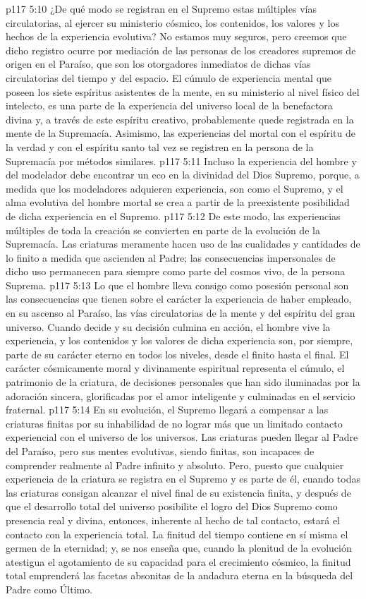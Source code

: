 \vs p117 5:10 ¿De qué modo se registran en el Supremo estas múltiples vías circulatorias, al ejercer su ministerio cósmico, los contenidos, los valores y los hechos de la experiencia evolutiva? No estamos muy seguros, pero creemos que dicho registro ocurre por mediación de las personas de los creadores supremos de origen en el Paraíso, que son los otorgadores inmediatos de dichas vías circulatorias del tiempo y del espacio. El cúmulo de experiencia mental que poseen los siete espíritus asistentes de la mente, en su ministerio al nivel físico del intelecto, es una parte de la experiencia del universo local de la benefactora divina y, a través de este espíritu creativo, probablemente quede registrada en la mente de la Supremacía. Asimismo, las experiencias del mortal con el espíritu de la verdad y con el espíritu santo tal vez se registren en la persona de la Supremacía por métodos similares.
\vs p117 5:11 Incluso la experiencia del hombre y del modelador debe encontrar un eco en la divinidad del Dios Supremo, porque, a medida que los modeladores adquieren experiencia, son como el Supremo, y el alma evolutiva del hombre mortal se crea a partir de la preexistente posibilidad de dicha experiencia en el Supremo.
\vs p117 5:12 De este modo, las experiencias múltiples de toda la creación se convierten en parte de la evolución de la Supremacía. Las criaturas meramente hacen uso de las cualidades y cantidades de lo finito a medida que ascienden al Padre; las consecuencias impersonales de dicho uso permanecen para siempre como parte del cosmos vivo, de la persona Suprema.
\vs p117 5:13 Lo que el hombre lleva consigo como posesión personal son las consecuencias que tienen sobre el carácter la experiencia de haber empleado, en su ascenso al Paraíso, las vías circulatorias de la mente y del espíritu del gran universo. Cuando decide y su decisión culmina en acción, el hombre vive la experiencia, y los contenidos y los valores de dicha experiencia son, por siempre, parte de su carácter eterno en todos los niveles, desde el finito hasta el final. El carácter cósmicamente moral y divinamente espiritual representa el cúmulo, el patrimonio de la criatura, de decisiones personales que han sido iluminadas por la adoración sincera, glorificadas por el amor inteligente y culminadas en el servicio fraternal.
\vs p117 5:14 En su evolución, el Supremo llegará a compensar a las criaturas finitas por su inhabilidad de no lograr más que un limitado contacto experiencial con el universo de los universos. Las criaturas pueden llegar al Padre del Paraíso, pero sus mentes evolutivas, siendo finitas, son incapaces de comprender realmente al Padre infinito y absoluto. Pero, puesto que cualquier experiencia de la criatura se registra en el Supremo y es parte de él, cuando todas las criaturas consigan alcanzar el nivel final de su existencia finita, y después de que el desarrollo total del universo posibilite el logro del Dios Supremo como presencia real y divina, entonces, inherente al hecho de tal contacto, estará el contacto con la experiencia total. La finitud del tiempo contiene en sí misma el germen de la eternidad; y, se nos enseña que, cuando la plenitud de la evolución atestigua el agotamiento de su capacidad para el crecimiento cósmico, la finitud total emprenderá las facetas absonitas de la andadura eterna en la búsqueda del Padre como Último.
